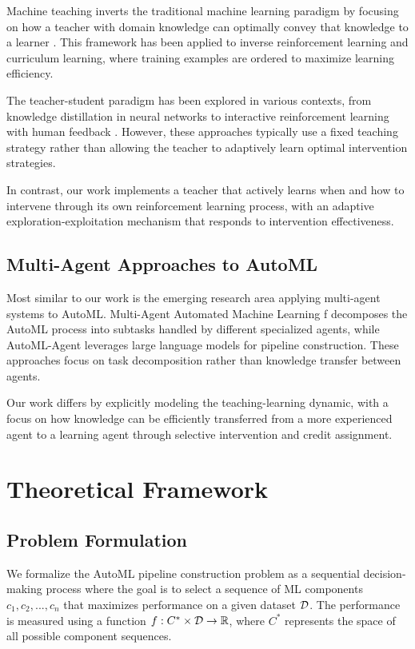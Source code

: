 \documentclass[twoside,11pt]{article}
\newcommand{\dataset}{{\cal D}}
\newcommand{\R}{\mathbb{R}}
\begin{document}
Machine teaching inverts the traditional machine learning paradigm by focusing on how a teacher with domain knowledge can optimally convey that knowledge to a learner \citep{zhu2015machine}. This framework has been applied to inverse reinforcement learning \citep{brown2018machine} and curriculum learning, where training examples are ordered to maximize learning efficiency.

The teacher-student paradigm has been explored in various contexts, from knowledge distillation in neural networks \citep{hinton2015} to interactive reinforcement learning with human feedback \citep{knox2009}. However, these approaches typically use a fixed teaching strategy rather than allowing the teacher to adaptively learn optimal intervention strategies.

In contrast, our work implements a teacher that actively learns when and how to intervene through its own reinforcement learning process, with an adaptive exploration-exploitation mechanism that responds to intervention effectiveness.

\subsection{Multi-Agent Approaches to AutoML}

Most similar to our work is the emerging research area applying multi-agent systems to AutoML. Multi-Agent Automated Machine Learning \citep{wang2022multi}f decomposes the AutoML process into subtasks handled by different specialized agents, while AutoML-Agent \citep{trirat2024automl} leverages large language models for pipeline construction. These approaches focus on task decomposition rather than knowledge transfer between agents.

Our work differs by explicitly modeling the teaching-learning dynamic, with a focus on how knowledge can be efficiently transferred from a more experienced agent to a learning agent through selective intervention and credit assignment.

\section{Theoretical Framework}

\subsection{Problem Formulation}

We formalize the AutoML pipeline construction problem as a sequential decision-making process where the goal is to select a sequence of ML components $c_1, c_2, ..., c_n$ that maximizes performance on a given dataset $\dataset$. The performance is measured using a function $f: C^* \times \dataset \rightarrow \R$, where $C^*$ represents the space of all possible component sequences.
\end{document}
